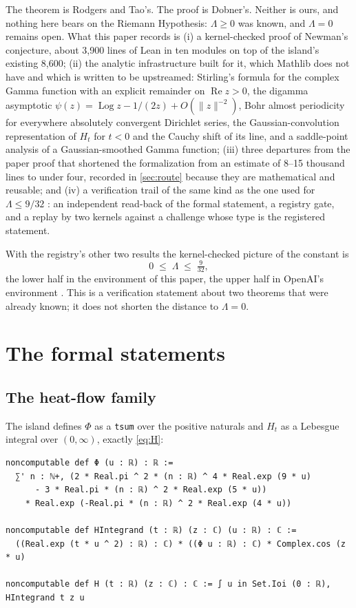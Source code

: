 \documentclass[11pt]{article}
\theoremstyle{definition}
\newcommand{\lean}[1]{\texttt{#1}}
\newcommand{\Lam}{\Lambda}
\newcommand{\Hfun}{H}
\newcommand{\re}{\operatorname{Re}}
\newcommand{\Log}{\operatorname{Log}}
\begin{document}
The theorem is Rodgers and Tao's. The proof is Dobner's. Neither is ours, and nothing here bears on the Riemann Hypothesis: $\Lam \ge 0$ was known, and $\Lam = 0$ remains open. What this paper records is (i) a kernel-checked proof of Newman's conjecture, about 3,900 lines of Lean in ten modules on top of the island's existing 8,600; (ii) the analytic infrastructure built for it, which Mathlib does not have and which is written to be upstreamed: Stirling's formula for the complex Gamma function with an explicit remainder on $\re z > 0$, the digamma asymptotic $\psi(z) = \Log z - 1/(2z) + O(\|z\|^{-2})$, Bohr almost periodicity for everywhere absolutely convergent Dirichlet series, the Gaussian-convolution representation of $\Hfun_t$ for $t<0$ and the Cauchy shift of its line, and a saddle-point analysis of a Gaussian-smoothed Gamma function; (iii) three departures from the paper proof that shortened the formalization from an estimate of 8--15 thousand lines to under four, recorded in \cref{sec:route} because they are mathematical and reusable; and (iv) a verification trail of the same kind as the one used for $\Lam \le 9/32$ \cite{Murphy932}: an independent read-back of the formal statement, a registry gate, and a replay by two kernels against a challenge whose type is the registered statement.

With the registry's other two results the kernel-checked picture of the constant is
\[
0 \;\le\; \Lam \;\le\; \tfrac{9}{32},
\]
the lower half in the environment of this paper, the upper half in OpenAI's environment \cite{Murphy932}. This is a verification statement about two theorems that were already known; it does not shorten the distance to $\Lam = 0$.

\section{The formal statements}\label{sec:statements}

\subsection{The heat-flow family}

The island defines $\Phi$ as a \lean{tsum} over the positive naturals and $\Hfun_t$ as a Lebesgue integral over $(0,\infty)$, exactly \eqref{eq:H}:

\begin{lstlisting}
noncomputable def Φ (u : ℝ) : ℝ :=
  ∑' n : ℕ+, (2 * Real.pi ^ 2 * (n : ℝ) ^ 4 * Real.exp (9 * u)
      - 3 * Real.pi * (n : ℝ) ^ 2 * Real.exp (5 * u))
    * Real.exp (-Real.pi * (n : ℝ) ^ 2 * Real.exp (4 * u))

noncomputable def HIntegrand (t : ℝ) (z : ℂ) (u : ℝ) : ℂ :=
  ((Real.exp (t * u ^ 2) : ℝ) : ℂ) * ((Φ u : ℝ) : ℂ) * Complex.cos (z * u)

noncomputable def H (t : ℝ) (z : ℂ) : ℂ := ∫ u in Set.Ioi (0 : ℝ), HIntegrand t z u
\end{lstlisting}
\end{document}
